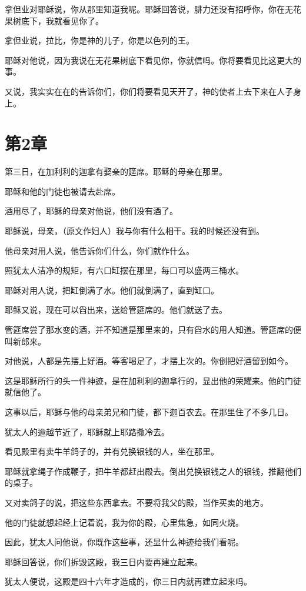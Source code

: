 \documentclass[12pt,oneside]{book}
\begin{document}
拿但业对耶稣说，你从那里知道我呢。耶稣回答说，腓力还没有招呼你，你在无花果树底下，我就看见你了。

拿但业说，拉比，你是神的儿子，你是以色列的王。

耶稣对他说，因为我说在无花果树底下看见你，你就信吗。你将要看见比这更大的事。

又说，我实实在在的告诉你们，你们将要看见天开了，神的使者上去下来在人子身上。

\chapter{第2章}
第三日，在加利利的迦拿有娶亲的筵席。耶稣的母亲在那里。

耶稣和他的门徒也被请去赴席。

酒用尽了，耶稣的母亲对他说，他们没有酒了。

耶稣说，母亲，（原文作妇人）我与你有什么相干。我的时候还没有到。

他母亲对用人说，他告诉你们什么，你们就作什么。

照犹太人洁净的规矩，有六口缸摆在那里，每口可以盛两三桶水。

耶稣对用人说，把缸倒满了水。他们就倒满了，直到缸口。

耶稣又说，现在可以舀出来，送给管筵席的。他们就送了去。

管筵席尝了那水变的酒，并不知道是那里来的，只有舀水的用人知道。管筵席的便叫新郎来。

对他说，人都是先摆上好酒。等客喝足了，才摆上次的。你倒把好酒留到如今。

这是耶稣所行的头一件神迹，是在加利利的迦拿行的，显出他的荣耀来。他的门徒就信他了。

这事以后，耶稣与他的母亲弟兄和门徒，都下迦百农去。在那里住了不多几日。

犹太人的逾越节近了，耶稣就上耶路撒冷去。

看见殿里有卖牛羊鸽子的，并有兑换银钱的人，坐在那里。

耶稣就拿绳子作成鞭子，把牛羊都赶出殿去。倒出兑换银钱之人的银钱，推翻他们的桌子。

又对卖鸽子的说，把这些东西拿去。不要将我父的殿，当作买卖的地方。

他的门徒就想起经上记着说，我为你的殿，心里焦急，如同火烧。

因此，犹太人问他说，你既作这些事，还显什么神迹给我们看呢。

耶稣回答说，你们拆毁这殿，我三日内要再建立起来。

犹太人便说，这殿是四十六年才造成的，你三日内就再建立起来吗。
\end{document}
